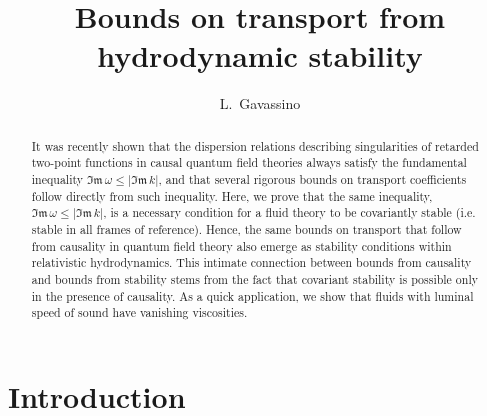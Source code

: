 \documentclass[a4paper, amsfonts, amssymb, amsmath, reprint, showkeys, nofootinbib, twoside,notitlepage]{revtex4-1}
\theoremstyle{definition}
\theoremstyle{theorem}
\theoremstyle{corollary}
\begin{document}
\title{Bounds on transport from hydrodynamic stability}
\author{L.~Gavassino}


\begin{abstract}
It was recently shown that the dispersion relations describing singularities of retarded two-point functions in causal quantum field theories always satisfy the fundamental inequality $\mathfrak{Im} \, \omega \leq |\mathfrak{Im} \, k|$, and that several rigorous bounds on transport coefficients follow directly from such inequality. Here, we prove that the same inequality, $\mathfrak{Im} \, \omega \leq |\mathfrak{Im} \, k|$, is a necessary condition for a fluid theory to be covariantly stable (i.e. stable in all frames of reference). Hence, the same bounds on transport that follow from causality in quantum field theory also emerge as stability conditions within relativistic hydrodynamics. This intimate connection between bounds from causality and bounds from stability stems from the fact that covariant stability is possible only in the presence of causality. As a quick application, we show that fluids with luminal speed of sound have vanishing viscosities.
\end{abstract} 



\maketitle




\section{Introduction} 
\end{document}
